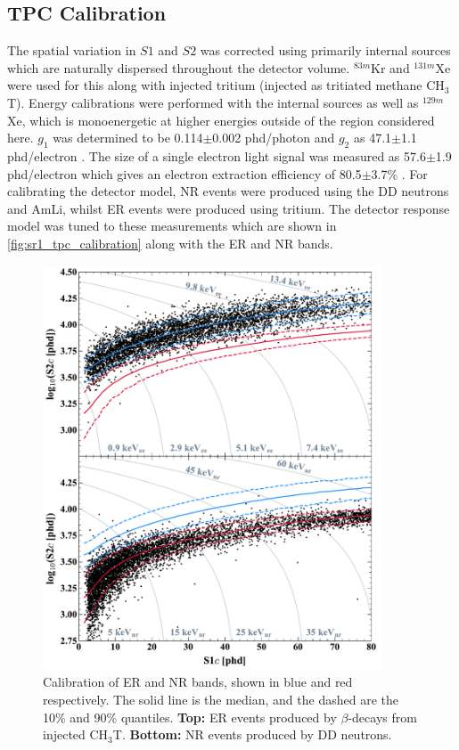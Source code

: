 \subsection{TPC Calibration}
\par
The spatial variation in $S1$ and $S2$ was corrected using primarily internal sources which are naturally dispersed throughout the detector volume.
${}^{83m}$Kr and ${}^{131m}$Xe were used for this along with injected tritium (injected as tritiated methane CH$_3$T).
Energy calibrations were performed with the internal sources as well as ${}^{129m}$Xe, which is monoenergetic at higher energies outside of the region considered here.
$g_1$ was determined to be 0.114$\pm$0.002 phd/photon and $g_2$ as 47.1$\pm$1.1 phd/electron \cite{lz_ws_sr1_ref}.
The size of a single electron light signal was measured as 57.6$\pm$1.9 phd/electron which gives an electron extraction efficiency of 80.5$\pm$3.7\% \cite{lz_ws_sr1_ref}.
For calibrating the detector model, NR events were produced using the DD neutrons and AmLi, whilst ER events were produced using tritium.
The detector response model was tuned to these measurements which are shown in \autoref{fig:sr1_tpc_calibration} along with the ER and NR bands.
\begin{figure}
    \centering
    \includegraphics[width=10cm]{Figures/EFT/All_SR1_Plots/SR1WS_calOnly_0629_twoPanel.pdf}
    \caption{Calibration of ER and NR bands, shown in blue and red respectively.
             The solid line is the median, and the dashed are the 10\% and 90\% quantiles.
             \textbf{Top:} ER events produced by $\beta$-decays from injected CH$_3$T.
             \textbf{Bottom:} NR events produced by DD neutrons.
             }
    \label{fig:sr1_tpc_calibration}
\end{figure}

